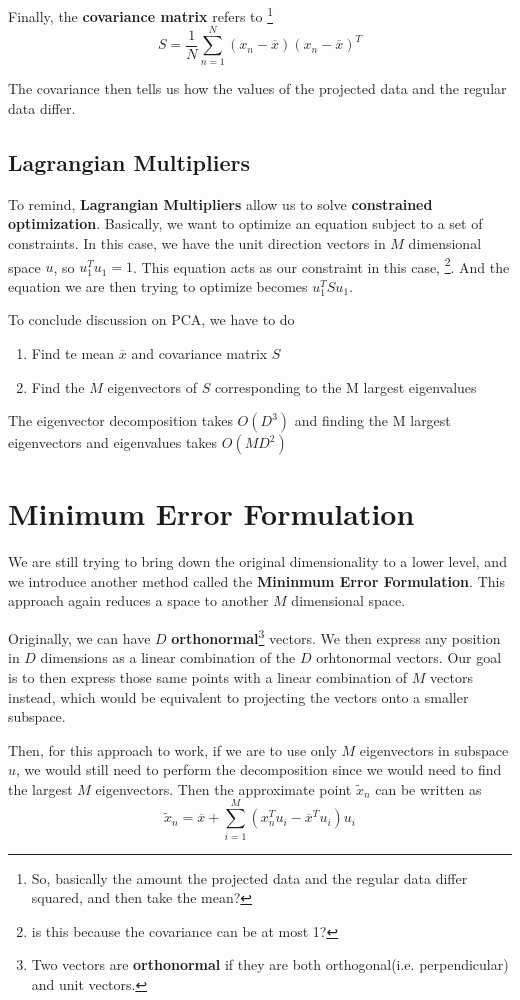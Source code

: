 \documentclass{tufte-handout}
\begin{document}
Finally, the \textbf{covariance matrix} refers to \footnote{So, basically the amount the projected
data and the regular data differ squared, and then take the mean?}
\[ S = \frac{1}{N}\sum_{n=1}^{N}(x_{n} - \overline{x})(x_{n} - \overline{x})^{T}\]

The covariance then tells us how the values of the projected data and the regular data differ. 
\subsection{Lagrangian Multipliers}
To remind, \textbf{Lagrangian Multipliers} allow us to solve \textbf{constrained optimization}. Basically,
we want to optimize an equation subject to a set of constraints. In this case, we have the unit direction vectors
in $M$ dimensional space $u$, so $u_{1}^{T}u_{1} = 1$. This equation acts as our constraint in this case,
\footnote{is this because the covariance can be at most 1?}. And the equation we are then trying to optimize
becomes $u^{T}_{1}Su_{1}$.  

To conclude discussion on PCA, we have to do
\begin{enumerate}
		\item{Find te mean $\overline{x}$ and covariance matrix $S$}
		\item{Find the $M$ eigenvectors of $S$ corresponding to the M largest eigenvalues}
\end{enumerate}
The	eigenvector decomposition takes $O(D^{3})$ and finding the M largest eigenvectors and eigenvalues 
takes $O(MD^{2})$
\section{Minimum Error Formulation}
We are still trying to bring down the original dimensionality to a lower level, and we introduce another 
method called the \textbf{Mininmum Error Formulation}. This approach again reduces a space to another 
$M$ dimensional space. 

Originally, we can have $D$ \textbf{orthonormal}\footnote{Two vectors are \textbf{orthonormal} if they are
both orthogonal(i.e. perpendicular) and unit vectors.} vectors. We then express any position in $D$ dimensions
as a linear combination of the $D$ orhtonormal vectors. Our goal is to then express those same points with a
linear combination of $M$ vectors instead, which would be equivalent to projecting the vectors onto a smaller
subspace.

Then, for this approach to work, if we are to use only $M$ eigenvectors in subspace $u$, we would still need to
perform the decomposition since we would need to find the largest $M$ eigenvectors. Then the approximate point
$\tilde{x}_{n}$ can be written as
\[ \tilde{x}_{n} = \overline{x} + \sum_{i=1}^{M}(x^{T}_{n}u_{i} - \overline{x}^{T}u_{i})u_{i}\]
\end{document}

